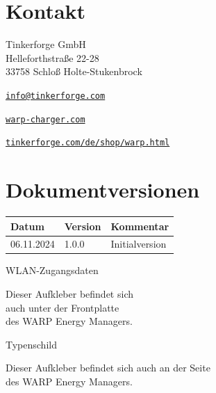 \documentclass[a4paper,10pt]{article}
\begin{document}
\begin{multicols*}{2}
    \section{Kontakt}
    Tinkerforge GmbH\\ Helleforthstraße 22-28\\ 33758 Schloß Holte-Stukenbrock
    \begin{description}[leftmargin=!,labelwidth=\widthof{\textbf{Website}}]
        \item[E-Mail] \href{mailto:info@tinkerforge.com}{\texttt{info@tinkerforge.com}}
        \item[Website] \href{https://warp-charger.com}{\texttt{warp-charger.com}}
        \item[Telefon] 
        \item[Shop] \href{https://tinkerforge.com/de/shop/warp.html}{\texttt{tinkerforge.com/de/shop/warp.html}}
    \end{description}

	\section{Dokumentversionen}
	\begin{tabular}{lll}
		\toprule
		Datum      & Version & Kommentar                       \\
		\midrule
		06.11.2024 & 1.0.0   & Initialversion                  \\
		\bottomrule
	\end{tabular}

	\vfill
	\null
	\newpage

	\columnbreak
    
    \end{multicols*}

    \appendix

	\newpage
	\pagecolor{covergray}\afterpage{\nopagecolor}

   \begin{multicols*}{2}
    \pagestyle{empty}
    \null
    \vfill
	\color{white}
    WLAN-Zugangsdaten
    \begin{tcolorbox}[width=4.2cm,height=2.7cm, boxrule=0.25mm]

    \end{tcolorbox}
	Dieser Aufkleber befindet sich\\ auch unter der Frontplatte\\des WARP Energy
	Managers.
    \columnbreak

    \null
    \vfill
    Typenschild
    \begin{tcolorbox}[width=7.8cm,height=4.1cm, boxrule=0.25mm]

    \end{tcolorbox}
    Dieser Aufkleber befindet sich auch an der Seite\\ des WARP Energy Managers.
\end{multicols*}
\end{document}

